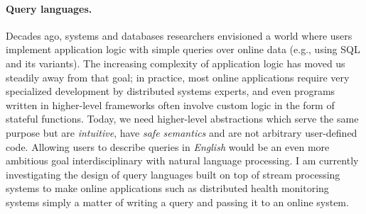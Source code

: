 \paragraph*{Query languages.}
Decades ago, systems and databases researchers envisioned a world where users implement application logic with simple queries over online data (e.g., using SQL and its variants). The increasing complexity of application logic has moved us steadily away from that goal; in practice, most online applications require very specialized development by distributed systems experts, and even programs written in higher-level frameworks often involve custom logic in the form of stateful functions. Today, we need higher-level abstractions which serve the same purpose but are \emph{intuitive}, have \emph{safe semantics} and are not arbitrary user-defined code.
Allowing users to describe queries in \emph{English} would be an even more ambitious goal interdisciplinary with natural language processing.
I am currently investigating the design of query languages built on top of stream processing systems to make online applications such as distributed health monitoring systems
simply a matter of writing a query and passing it to an online system.
